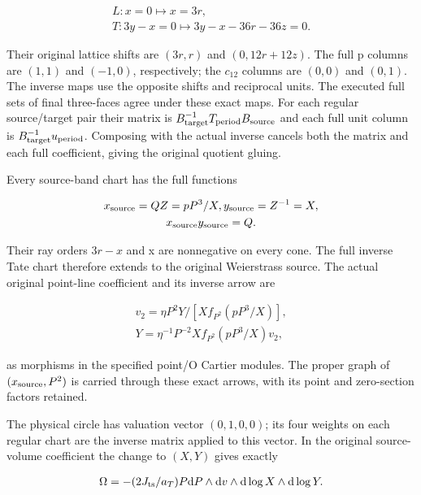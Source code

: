 \[
\begin{gathered}
L: x=0 \longmapsto  x=3r, \\
T: 3y-x=0 \longmapsto  3y-x-36r-36z=0.
\end{gathered}
\]

Their original lattice shifts are \((3r,r)\) and \((0,12r+12z)\).
The full p columns are \((1,1)\) and \((-1,0)\), respectively; the \(c_{12}\)
columns are \((0,0)\) and \((0,1)\). The inverse maps use the opposite
shifts and reciprocal units. The executed full sets of final
three-faces agree under these exact maps. For each regular
source/target pair their matrix is \(B_{\rm target}^{-1} T_{\rm period} B_{\rm source}\)
and each full unit column is \(B_{\rm target}^{-1} u_{\rm period}\). Composing
with the actual inverse cancels both the matrix and each full
coefficient, giving the original quotient gluing.

Every source-band chart has the full functions

\[
\begin{gathered}
x_{\rm source}=QZ=pP^{3}/X, y_{\rm source}=Z^{-1}=X, \\
x_{\rm source} y_{\rm source}=Q.
\end{gathered}
\]

Their ray orders \(3r-x\) and x are nonnegative on every cone.
The full inverse Tate chart therefore extends to the original
Weierstrass source. The actual original point-line coefficient
and its inverse arrow are

\[
\begin{gathered}
v_{2}=\eta P^{2} Y/[X f_{P^{2}}(pP^{3}/X)], \\
Y=\eta^{-1} P^{-2} X f_{P^{2}}(pP^{3}/X) v_{2},
\end{gathered}
\]

as morphisms in the specified point/O Cartier modules. The
proper graph of \((x_{\rm source},P^{2})\) is carried through these exact
arrows, with its point and zero-section factors retained.

The physical circle has valuation vector \((0,1,0,0)\); its four
weights on each regular chart are the inverse matrix applied
to this vector. In the original source-volume coefficient the
change to \((X,Y)\) gives exactly

\[
\begin{gathered}
\Omega=-(2J_{\rm ts}/a_T) P \mathrm dP\wedge \mathrm dv\wedge \mathrm d\log X\wedge \mathrm d\log Y.
\end{gathered}
\]

